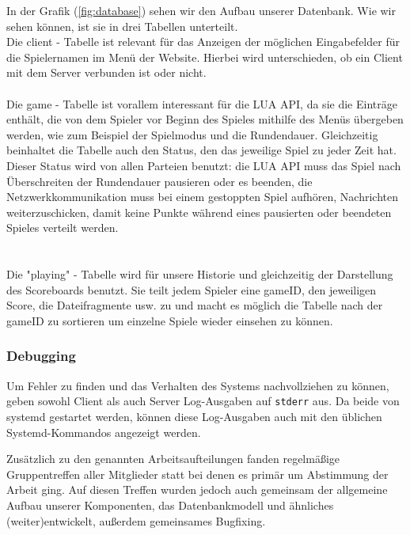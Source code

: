 In der Grafik (\cref{fig:database}) sehen wir den Aufbau unserer Datenbank. Wie wir sehen können, ist sie in drei Tabellen unterteilt.\\
Die client - Tabelle ist relevant für das Anzeigen der möglichen Eingabefelder für die Spielernamen im Menü der Website. Hierbei wird unterschieden, ob ein Client mit dem Server verbunden ist oder nicht.\\\\
Die game - Tabelle ist vorallem interessant für die LUA API, da sie die Einträge enthält, die von dem Spieler vor Beginn des Spieles mithilfe des Menüs übergeben werden, wie zum Beispiel der Spielmodus und die Rundendauer. Gleichzeitig beinhaltet die Tabelle auch den Status, den das jeweilige Spiel zu jeder Zeit hat. Dieser Status wird von allen Parteien benutzt: die LUA API muss das Spiel nach Überschreiten der Rundendauer pausieren oder es beenden, die Netzwerkkommunikation muss bei einem gestoppten Spiel aufhören, Nachrichten weiterzuschicken, damit keine Punkte während eines pausierten oder beendeten Spieles verteilt werden.\\\\\\
Die "playing" - Tabelle wird für unsere Historie und gleichzeitig der Darstellung des Scoreboards benutzt. Sie teilt jedem Spieler eine gameID, den jeweiligen Score, die Dateifragmente usw. zu und macht es möglich die Tabelle nach der gameID zu sortieren um einzelne Spiele wieder einsehen zu können.

\subsubsection{Debugging}

Um Fehler zu finden und das Verhalten des Systems nachvollziehen zu können, geben sowohl Client als auch Server Log-Ausgaben auf \texttt{stderr} aus. Da beide von systemd gestartet werden, können diese Log-Ausgaben auch mit den üblichen Systemd-Kommandos angezeigt werden.\newline

Zusätzlich zu den genannten Arbeitsaufteilungen fanden regelmäßige Gruppentreffen aller Mitglieder statt bei denen es primär um Abstimmung der Arbeit ging. Auf diesen Treffen wurden jedoch auch gemeinsam der allgemeine Aufbau unserer Komponenten, das Datenbankmodell und ähnliches (weiter)entwickelt, außerdem gemeinsames Bugfixing.

